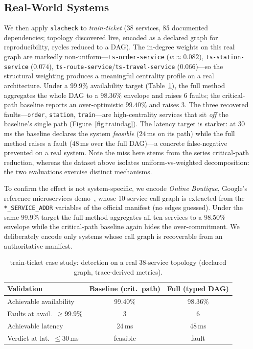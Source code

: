 \documentclass[conference]{IEEEtran}
\begin{document}
\subsection{Real-World Systems}\label{sec:casestudy}

We then apply \texttt{slacheck} to \emph{train-ticket} (38 services, 85 documented dependencies; topology discovered live, encoded as a declared graph for reproducibility, cycles reduced to a DAG). The in-degree weights on this real graph are markedly non-uniform---\texttt{ts-order-service} ($w \approx 0.082$), \texttt{ts-station-service} ($0.074$), \texttt{ts-route-service}/\texttt{ts-travel-service} ($0.066$)---so the structural weighting produces a meaningful centrality profile on a real architecture. Under a $99.9\%$ availability target (Table~\ref{tab:casestudy}), the full method aggregates the whole DAG to a $98.36\%$ envelope and raises 6 faults; the critical-path baseline reports an over-optimistic $99.40\%$ and raises 3. The three recovered faults---\texttt{order}, \texttt{station}, \texttt{train}---are high-centrality services that sit \emph{off} the baseline's single path (Figure~\ref{fig:traindag}). The latency target is starker: at $30$\,ms the baseline declares the system \emph{feasible} ($24$\,ms on its path) while the full method raises a fault ($48$\,ms over the full DAG)---a concrete false-negative prevented on a real system. Note the miss here stems from the series critical-path reduction, whereas the dataset above isolates uniform-vs-weighted decomposition: the two evaluations exercise distinct mechanisms.

To confirm the effect is not system-specific, we encode \emph{Online Boutique}, Google's reference microservices demo~\cite{googleboutique}, whose 10-service call graph is extracted from the \texttt{*\_SERVICE\_ADDR} variables of the official manifest (no edges guessed). Under the same $99.9\%$ target the full method aggregates all ten services to a $98.50\%$ envelope while the critical-path baseline again hides the over-commitment. We deliberately encode only systems whose call graph is recoverable from an authoritative manifest.

\begin{table}[htbp]
\caption{train-ticket case study: detection on a real 38-service topology (declared graph, trace-derived metrics).}
\begin{center}
\begin{tabular}{|l|c|c|}
\hline
\textbf{Validation} & \textbf{Baseline (crit.\ path)} & \textbf{Full (typed DAG)} \\
\hline
Achievable availability         & 99.40\% & 98.36\% \\
Faults at avail.\ $\geq 99.9\%$  & 3       & 6 \\
Achievable latency              & 24\,ms  & 48\,ms \\
Verdict at lat.\ $\leq 30$\,ms   & feasible & fault \\
\hline
\end{tabular}
\label{tab:casestudy}
\end{center}
\end{table}
\end{document}
